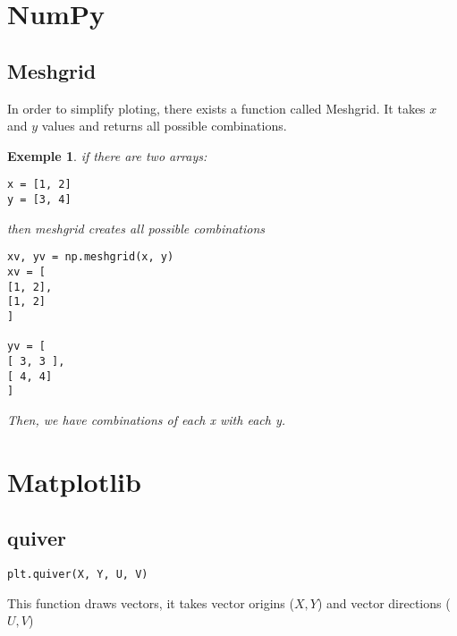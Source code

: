 \documentclass[a4paper]{article}
\newtheorem{exemple}{Exemple}[section]
\begin{document}
    \section{NumPy}
    \subsection{Meshgrid}
    In order to simplify ploting, there exists a function called Meshgrid. It takes $x$ and  $y$ values and returns all possible combinations.
     \begin{exemple}
         if there are two arrays:
         \begin{verbatim}
x = [1, 2]
y = [3, 4]
        \end{verbatim} 
then meshgrid creates all possible combinations


         \begin{verbatim}
xv, yv = np.meshgrid(x, y)
xv = [
[1, 2],
[1, 2]
]

yv = [
[ 3, 3 ],
[ 4, 4]
]
        \end{verbatim} 

Then, we have combinations of each x with each y.
    \end{exemple}

    \section{Matplotlib}
    \subsection{quiver}
    \begin{verbatim}
plt.quiver(X, Y, U, V) 
    \end{verbatim}
    This function draws vectors, it takes vector origins ($X, Y$) and vector directions ($U, V$)
\end{document}
